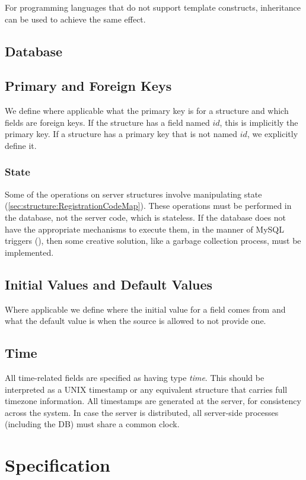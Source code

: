 \documentclass[a4paper,10pt]{article}
\begin{document}
For programming languages that do not support template constructs, inheritance can be used to achieve the same effect.

\subsection{Database}

\subsection{Primary and Foreign Keys}
We define where applicable what the primary key is for a structure and which fields are foreign keys. If the structure has a field named $id$, this is implicitly the primary key. 
If a structure has a primary key that is not named $id$, we explicitly define it.

\subsubsection{State}
Some of the operations on server structures involve manipulating state (\ref{sec:structure:RegistrationCodeMap}). These operations must be performed in the database, not the 
server code, which is stateless. If the database does not have the appropriate mechanisms to execute them, in the manner of MySQL triggers (\cite{mysql_trigger}), then some 
creative solution, like a garbage collection process, must be implemented.

\subsection{Initial Values and Default Values}
Where applicable we define where the initial value for a field comes from and what the default value is when the source is allowed to not provide one.

\subsection{Time}
All time-related fields are specified as having type {\em time}. This should be interpreted as a UNIX timestamp or any equivalent structure that carries full timezone information. 
All timestamps are generated at the server, for consistency across the system. In case the server is distributed, all server-side processes (including the DB) must share a common 
clock.

\section{Specification}
\end{document}
